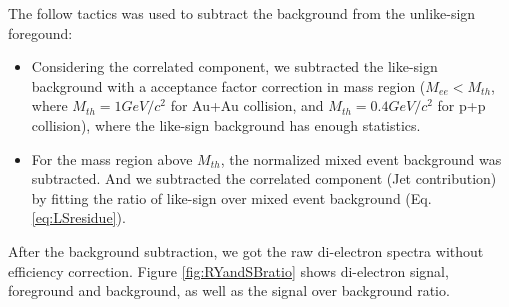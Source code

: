 The follow tactics was used to subtract the background from the unlike-sign
foregound:
\begin{itemize}
\item Considering the correlated component, we subtracted the like-sign
background with a acceptance factor correction in mass region ($M_{ee}<M_{th}$,
where $M_{th}=1GeV/c^{2}$ for Au+Au collision, and $M_{th}=0.4GeV/c^{2}$
for p+p collision), where the like-sign background has enough statistics.
\item For the mass region above $M_{th}$, the normalized mixed event background
was subtracted. And we subtracted the correlated component (Jet contribution)
by fitting the ratio of like-sign over mixed event background (Eq.
\ref{eq:LSresidue}).
\end{itemize}
After the background subtraction, we got the raw di-electron spectra
without efficiency correction. Figure \ref{fig:RYandSBratio} shows
di-electron signal, foreground and background, as well as the signal
over background ratio.
